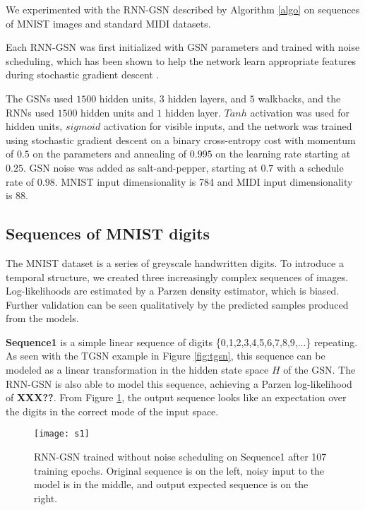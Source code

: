 We experimented with the RNN-GSN described by Algorithm \ref{algo} on sequences of MNIST images and standard MIDI datasets.

Each RNN-GSN was first initialized with GSN parameters and trained with noise scheduling, which has been shown to help the network learn appropriate features during stochastic gradient descent \cite{noise_schedule}.

The GSNs used $1500$ hidden units, $3$ hidden layers, and $5$ walkbacks, and the RNNs used $1500$ hidden units and $1$ hidden layer. $Tanh$ activation was used for hidden units, $sigmoid$ activation for visible inputs, and the network was trained using stochastic gradient descent on a binary cross-entropy cost with momentum of $0.5$ on the parameters and annealing of $0.995$ on the learning rate starting at $0.25$. GSN noise was added as salt-and-pepper, starting at $0.7$ with a schedule rate of $0.98$. MNIST input dimensionality is 784 and MIDI input dimensionality is 88.
\subsection{Sequences of MNIST digits}
The MNIST dataset is a series of greyscale handwritten digits. To introduce a temporal structure, we created three increasingly complex sequences of images. Log-likelihoods are estimated by a Parzen density estimator, which is biased. Further validation can be seen qualitatively by the predicted samples produced from the models.

\textbf{Sequence1} is a simple linear sequence of digits \{0,1,2,3,4,5,6,7,8,9,...\} repeating. As seen with the TGSN example in Figure \ref{fig:tgsn}, this sequence can be modeled as a linear transformation in the hidden state space $H$ of the GSN. The RNN-GSN is also able to model this sequence, achieving a Parzen log-likelihood of \textbf{XXX??}. From Figure \ref{fig:s1}, the output sequence looks like an expectation over the digits in the correct mode of the input space.
\begin{figure}[h!]
  \centering
    \texttt{[image: s1]}
\caption{RNN-GSN trained without noise scheduling on Sequence1 after 107 training epochs. Original sequence is on the left, noisy input to the model is in the middle, and output expected sequence is on the right.}\label{fig:s1}
\end{figure}

